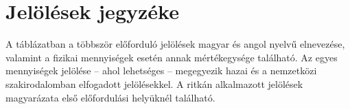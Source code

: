 \documentclass[12pt,a4paper]{article}
\begin{document}



\newpage
\thispagestyle{plain}

\newpage

\thispagestyle{plain}
\section*{Jelölések jegyzéke}

A táblázatban a többször előforduló jelölések magyar és angol nyelvű elnevezése, valamint a fizikai mennyiségek esetén annak mértékegysége található. Az egyes mennyiségek jelölése – ahol lehetséges – megegyezik hazai és a nemzetközi szakirodalomban elfogadott jelölésekkel. A ritkán alkalmazott jelölések magyarázata első előfordulási helyüknél található.
\end{document}
